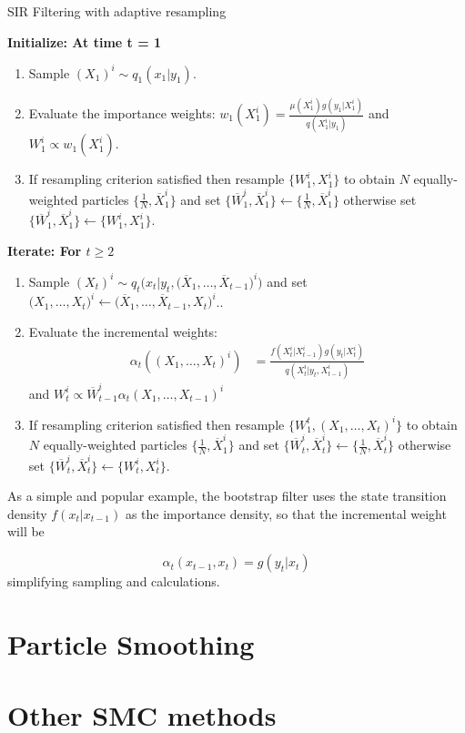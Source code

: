 \begin{algorithm}[H]
\caption{SIR Filtering with adaptive resampling}\label{Filtering}
    \begin{algorithmic}
        \State  \bf{Initialize:} \normalfont At time t = 1
            \begin{enumerate}
	            \item Sample $(X_{1})^i \sim q_1(x_1 | y_1)$.
	            \item Evaluate the importance weights: $w_1(X_1^i) = \frac{\mu(X^i_1)g(y_1 | X^i_1)}{q(X_1^i | y_1)}$ and $W^i_1 \propto w_1(X_1^i)$.
	            \item If resampling criterion satisfied then resample $\{ W_1^i, X_1^i \}$ to obtain $N$ equally-weighted particles $\big\{ \frac{1}{N}, \overline{X}_1^i \big\}$ and set $\big\{ \overline{W}_1^i, \overline{X}_1^i \big\} \leftarrow \big\{ \frac{1}{N}, \overline{X}_1^i \big\}$ otherwise set $\big\{ \overline{W}_1^i, \overline{X}_1^i \big\} \leftarrow \big\{ W^i_1, X_1^i \big\}$.
            \end{enumerate}
        \State  \bf{Iterate:} \normalfont For $t \geq 2$
            \begin{enumerate}
	            \item Sample $(X_{t})^i \sim q_t \big(x_t | y_t,  \big(\overline{X}_1, \dots, \overline{X}_{t-1} \big)^i \big)$ and set $\big(X_{1}, \dots, X_{t} \big)^i \leftarrow \big(\overline{X}_1, \dots, \overline{X}_{t-1}, X_t \big)^i$..
	            \item Evaluate the incremental weights: 
	                \begin{align*}
	                    \alpha_t((X_1, \dots, X_t)^i) & = \frac{f(X^i_t | X^i_{t-1})g(y_t | X^i_t)}{q(X_t^i | y_t, X^i_{t-1})}
	                \end{align*}
	                and $W^i_t \propto \overline{W}^i_{t-1} \alpha_t(X_1, \dots, X_{t-1})^i$
	            \item If resampling criterion satisfied then resample $\{ W_1^t, (X_1, \dots, X_t)^i \}$ to obtain $N$ equally-weighted particles $\big\{ \frac{1}{N}, \overline{X}_1^i \big\}$ and set $\big\{ \overline{W}_t^i, \overline{X}_t^i \big\} \leftarrow \big\{ \frac{1}{N}, \overline{X}_t^i \big\}$ otherwise set $\big\{ \overline{W}_t^i, \overline{X}_t^i \big\} \leftarrow \big\{ W^i_t, X_t^i \big\}$.
	        \end{enumerate}
    \end{algorithmic}
\end{algorithm}
As a simple and popular example, the bootstrap filter uses the state transition density $f(x_t | x_{t-1})$ as the importance density, so that the incremental weight will be 

\begin{equation*}
    \alpha_t(x_{t-1}, x_t) = g(y_t | x_t)
\end{equation*}
simplifying sampling and calculations.

\section{Particle Smoothing}



\section{Other SMC methods}
